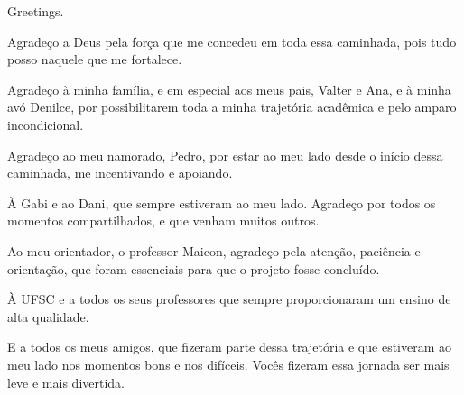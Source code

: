 


\begin{agradecimentos}

\lang
{
    Greetings.
}
{
    Agradeço a Deus pela força que me concedeu em toda essa caminhada, pois tudo posso naquele que me fortalece.

    Agradeço à minha família, e em especial aos meus pais, Valter e Ana, e à minha avó Denilce, por possibilitarem toda a minha trajetória acadêmica e pelo amparo incondicional.

    Agradeço ao meu namorado, Pedro, por estar ao meu lado desde o início dessa caminhada, me incentivando e apoiando.

    À Gabi e ao Dani, que sempre estiveram ao meu lado. Agradeço por todos os momentos compartilhados, e que venham muitos outros.

    Ao meu orientador, o professor Maicon, agradeço pela atenção, paciência e orientação, que foram essenciais para que o projeto fosse concluído.

    À UFSC e a todos os seus professores que sempre proporcionaram um ensino de alta qualidade.

    E a todos os meus amigos, que fizeram parte dessa trajetória e que estiveram ao meu lado nos momentos bons e nos difíceis. Vocês fizeram essa jornada ser mais leve e mais divertida.

}

\end{agradecimentos}


%
%
%
